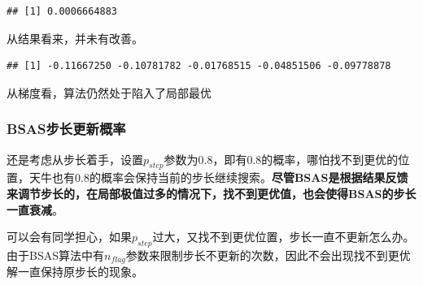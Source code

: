 \documentclass[]{ctexbook}
\newenvironment{Shaded}{\begin{snugshade}}{\end{snugshade}}
\newcommand{\KeywordTok}[1]{\textcolor[rgb]{0.13,0.29,0.53}{\textbf{#1}}}
\newcommand{\DataTypeTok}[1]{\textcolor[rgb]{0.13,0.29,0.53}{#1}}
\newcommand{\DecValTok}[1]{\textcolor[rgb]{0.00,0.00,0.81}{#1}}
\newcommand{\FloatTok}[1]{\textcolor[rgb]{0.00,0.00,0.81}{#1}}
\newcommand{\StringTok}[1]{\textcolor[rgb]{0.31,0.60,0.02}{#1}}
\newcommand{\OperatorTok}[1]{\textcolor[rgb]{0.81,0.36,0.00}{\textbf{#1}}}
\newcommand{\NormalTok}[1]{#1}
\begin{document}
\begin{verbatim}
## [1] 0.0006664883
\end{verbatim}

从结果看来，并未有改善。

\begin{Shaded}
\end{Shaded}

\begin{verbatim}
## [1] -0.11667250 -0.10781782 -0.01768515 -0.04851506 -0.09778878
\end{verbatim}

从梯度看，算法仍然处于陷入了局部最优

\subsubsection{BSAS步长更新概率}\label{bsas}

还是考虑从步长着手，设置\(p_{step}\)参数为0.8，即有0.8的概率，哪怕找不到更优的位置，天牛也有0.8的概率会保持当前的步长继续搜索。\textbf{尽管BSAS是根据结果反馈来调节步长的，在局部极值过多的情况下，找不到更优值，也会使得BSAS的步长一直衰减}。

可以会有同学担心，如果\(p_{step}\)过大，又找不到更优位置，步长一直不更新怎么办。由于BSAS算法中有\(n_{flag}\)参数来限制步长不更新的次数，因此不会出现找不到更优解一直保持原步长的现象。

\begin{Shaded}
\end{Shaded}
\end{document}
